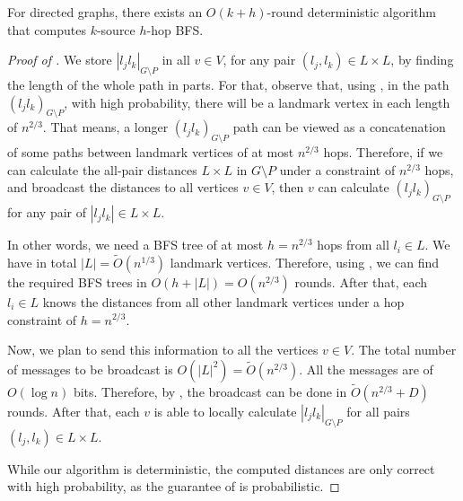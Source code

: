 \begin{lemma}\label{kbfs}
    For directed graphs, there exists an $O(k+h)$-round deterministic algorithm that computes $k$-source $h$-hop BFS.
\end{lemma}

\begin{proof}[Proof of ]
    We store $|l_jl_k|_{G \setminus P}$  in all $v \in V$, for any pair $(l_j,l_k) \in L \times L$, by finding the length of the whole path in parts. For that, observe that, using , in the path $(l_jl_k)_{G \setminus P}$, with high probability, there will be a landmark vertex in each length of $n^{2/3} $. That means, a longer $(l_jl_k)_{G \setminus P}$ path can be viewed as a concatenation of some paths between landmark vertices of at most $n^{2/3} $ hops. Therefore, if we can calculate the all-pair distances $L \times L$ in $G \setminus P$ under a constraint of $n^{2/3}$ hops, and broadcast the distances to all vertices $v \in V$, then $v$ can calculate $(l_jl_k)_{G \setminus P}$  for any pair of $|l_jl_k| \in L \times L$.

    In other words, we need a BFS tree of at most $h = n^{2/3}$ hops from all $l_i \in L$. We have in total $|L| = \widetilde{O}(n^{1/3})$ landmark vertices. Therefore, using , we can find the required BFS trees in $O(h+|L|) = O(n^{2/3})$ rounds. After that, each $l_i \in L$ knows the distances from all other landmark vertices under a hop constraint of $h = n^{2/3}$.
    
    

    Now, we plan to send this information to all the vertices $v \in V$. The total number of messages to be broadcast is $O(|L|^2) = \widetilde{O}(n^{2/3})$.    
    All the messages are of $O(\log n)$ bits. Therefore, by , the broadcast can be done in $\widetilde{O}(n^{2/3} + D)$ rounds.
    After that, each $v$ is able to locally calculate $|l_jl_k|_{G \setminus P}$  for all pairs $(l_j,l_k) \in L \times L$.

    While our algorithm is deterministic, the computed distances are only correct with high probability, as the guarantee of  is probabilistic.
\end{proof}









